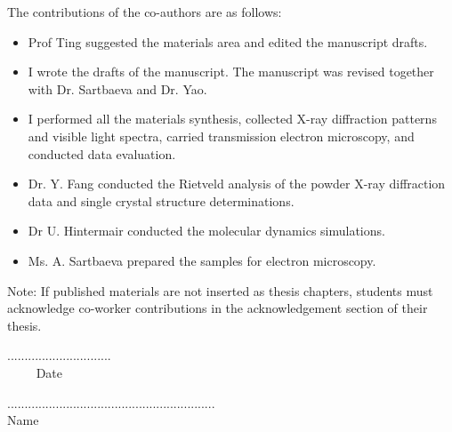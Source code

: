 The contributions of the co-authors are as follows:
\begin{itemize}
	\item Prof Ting suggested the materials area and edited the manuscript drafts.
	\item I wrote the drafts of the manuscript.  The manuscript was revised together with Dr. Sartbaeva and Dr. Yao.
	\item I performed all the materials synthesis, collected X-ray diffraction patterns and visible light spectra, carried transmission electron microscopy, and conducted data evaluation.
	\item Dr. Y. Fang conducted the Rietveld analysis of the powder X-ray diffraction data and single crystal structure determinations.
	\item Dr U. Hintermair conducted the molecular dynamics simulations.
	\item Ms. A. Sartbaeva prepared the samples for electron microscopy.
\end{itemize}

Note: If published materials are not inserted as thesis chapters, students must acknowledge co-worker contributions in the acknowledgement section of their thesis.

\vspace{25em}

\begin{minipage}{0.45\textwidth}
	\begin{flushleft}
		.............................. \\
		$\quad\quad$ Date
	\end{flushleft}
\end{minipage}
\begin{minipage}{0.45\textwidth}
	\begin{flushright}
		............................................................ \\
		\centering Name
	\end{flushright}
\end{minipage}